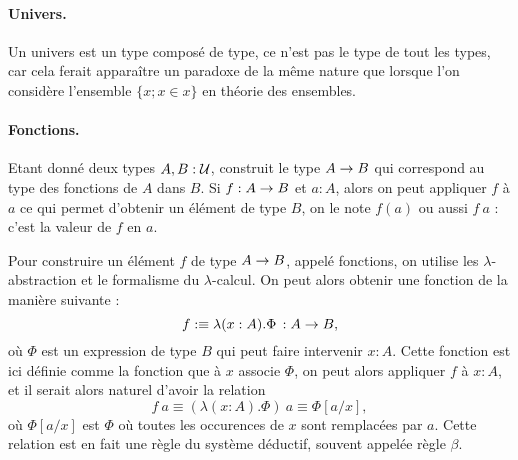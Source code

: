 \documentclass[../../rapport.tex]{subfiles}
\begin{document}
  \paragraph{Univers.}

  Un univers est un type composé de type, ce n'est pas le type de tout les types,
  car cela ferait apparaître un paradoxe de la même nature que lorsque l'on considère l'ensemble
  $\{x ; x \in x\}$ en théorie des ensembles.

  \paragraph{Fonctions.}

  Etant donné deux types $A, B : \mathcal U$, construit le type $A \rightarrow B$ qui correspond au type des fonctions
  de $A$ dans $B$.
  Si $f : A \rightarrow B$ et $a : A$, alors on peut appliquer $f$ à $a$ ce qui permet d'obtenir un élément de type $B$,
  on le note $f(a)$ ou aussi $f\ a$ : c'est la valeur de $f$ en $a$.

  Pour construire un élément $f$ de type $A \rightarrow B$, appelé fonctions, on utilise les $\lambda$-abstraction
  et le formalisme du $\lambda$-calcul.
  On peut alors obtenir une fonction de la manière suivante :
  $$f :\equiv \lambda (x : A). \Phi \, : A \rightarrow B,$$
  où $\Phi$ est un expression de type $B$ qui peut faire intervenir $x : A$.
  Cette fonction est ici définie comme la fonction que à $x$ associe $\Phi$,
  on peut alors appliquer $f$ à $x : A$, et il serait alors naturel d'avoir la relation
  $$f\ a \equiv (\lambda (x : A). \Phi)\ a \equiv \Phi [a/x],$$
  où $\Phi [a/x]$ est $\Phi$ où toutes les occurences de $x$ sont remplacées par $a$.
  Cette relation est en fait une règle du système déductif, souvent appelée règle $\beta$.
\end{document}

